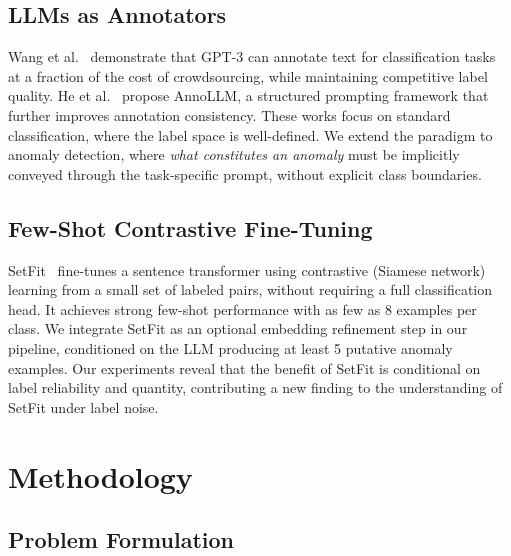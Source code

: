 \documentclass[12pt]{article}
\begin{document}
\subsection{LLMs as Annotators}

Wang et al.~\cite{wang2021want} demonstrate that GPT-3 can annotate text 
for classification tasks at a fraction of the cost of crowdsourcing, while 
maintaining competitive label quality. He et al.~\cite{he2023annollm} propose 
AnnoLLM, a structured prompting framework that further improves annotation 
consistency. These works focus on standard classification, where the label space 
is well-defined. We extend the paradigm to anomaly detection, where 
\textit{what constitutes an anomaly} must be implicitly conveyed through 
the task-specific prompt, without explicit class boundaries.

\subsection{Few-Shot Contrastive Fine-Tuning}

SetFit~\cite{tunstall2022efficient} fine-tunes a sentence transformer 
using contrastive (Siamese network) learning from a small set of labeled 
pairs, without requiring a full classification head. It achieves strong 
few-shot performance with as few as 8 examples per class. We integrate 
SetFit as an optional embedding refinement step in our pipeline, 
conditioned on the LLM producing at least 5 putative anomaly examples. 
Our experiments reveal that the benefit of SetFit is conditional on label 
reliability and quantity, contributing a new finding to the understanding 
of SetFit under label noise.


\section{Methodology}

\subsection{Problem Formulation}
\end{document}
